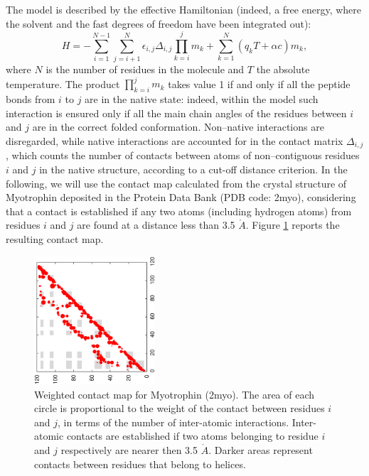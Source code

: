 The model is described by the 
effective Hamiltonian (indeed, a free energy, where the solvent and the fast
degrees of freedom have been integrated out):
\begin{equation}
H =  - \sum_{i=1}^{N-1}\sum_{j=i+1}^{N}
\epsilon_{i,j} \Delta_{i,j} \prod_{k=i}^{j} m_k
+  \sum_{k=1}^{N} (q_k  T +  \alpha c) m_k  ,
\label{Hamiltonian}
\end{equation}
where $N$ is the number of residues  in the molecule and $T$ the absolute
temperature. The product ${\prod_{k=i}^j} m_k$ takes value 1 if and only
if all the peptide bonds from $i$ to $j$ are in the native state: indeed, within
the model such interaction is ensured only if all the main chain angles of the
residues between $i$ and $j$ are in the correct folded conformation.
Non--native interactions are
disregarded, while native interactions are accounted for in the contact matrix
$\Delta_{i,j}$, which counts the number of contacts between atoms of
non--contiguous residues $i$ and $j$ in the native structure, according to a
cut-off distance criterion. In the following, we will use the contact map
calculated from the crystal structure of Myotrophin deposited in the Protein
Data Bank  (PDB code: 2myo), considering that a contact is established if any
two atoms (including hydrogen atoms) from residues $i$ and $j$ are found at a
distance less than 3.5 $\mathring{A}$.  Figure \ref{fig:map} reports the
resulting contact map.

\begin{figure}
\centering
\includegraphics[width=0.4\textwidth,angle=-90]{./img/wsme/allH-map-square.eps}
\caption{\label{fig:map}Weighted contact map for Myotrophin (2myo). The
area of each circle is proportional to the weight of the contact between
residues $i$ and $j$, in terms of the number of inter-atomic interactions.
Inter-atomic contacts are established if two atoms belonging to residue $i$ and
$j$ respectively are nearer then 3.5 $\mathring{A}$.
Darker areas represent contacts between residues that
belong to helices.}
\end{figure}

